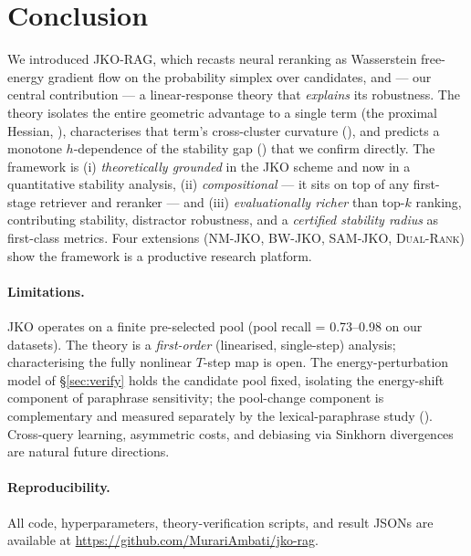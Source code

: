 \documentclass{article}
\theoremstyle{plain}
\newcommand{\jko}{\textsc{JKO-RAG}}
\newcommand{\bwjko}{\textsc{BW-JKO}}
\newcommand{\nmjko}{\textsc{NM-JKO}}
\newcommand{\samjko}{\textsc{SAM-JKO}}
\newcommand{\dualrank}{\textsc{Dual-Rank}}
\begin{document}
\section{Conclusion}
\label{sec:conclusion}

We introduced \jko, which recasts neural reranking as Wasserstein free-energy gradient flow on the probability simplex over candidates, and --- our central contribution --- a linear-response theory that \emph{explains} its robustness. The theory isolates the entire geometric advantage to a single term (the proximal Hessian, ), characterises that term's cross-cluster curvature (), and predicts a monotone $h$-dependence of the stability gap () that we confirm directly. The framework is (i) \emph{theoretically grounded} in the JKO scheme and now in a quantitative stability analysis, (ii) \emph{compositional} --- it sits on top of any first-stage retriever and reranker --- and (iii) \emph{evaluationally richer} than top-$k$ ranking, contributing stability, distractor robustness, and a \emph{certified stability radius} as first-class metrics. Four extensions (\nmjko, \bwjko, \samjko, \dualrank) show the framework is a productive research platform.

\paragraph{Limitations.}
JKO operates on a finite pre-selected pool (pool recall = 0.73--0.98 on our datasets). The theory is a \emph{first-order} (linearised, single-step) analysis; characterising the fully nonlinear $T$-step map is open. The energy-perturbation model of \S\ref{sec:verify} holds the candidate pool fixed, isolating the energy-shift component of paraphrase sensitivity; the pool-change component is complementary and measured separately by the lexical-paraphrase study (). Cross-query learning, asymmetric costs, and debiasing via Sinkhorn divergences~\cite{feydy2019aistats} are natural future directions.

\paragraph{Reproducibility.}
All code, hyperparameters, theory-verification scripts, and result JSONs are available at \url{https://github.com/MurariAmbati/jko-rag}.

\appendix
\end{document}
